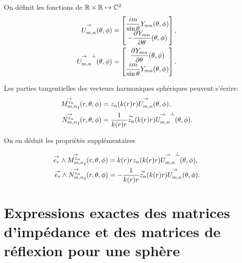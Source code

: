     \begin{defn}
        On définit les fonctions de \(\RR\times\RR\mapsto \CC^2\)
        \begin{align}
            \label{eq:defUmn_tgt}
            \Umn(\tp) &=
            \begin{bmatrix}
                \frac{im}{\sin\theta}Y_{mn}(\tp)
                \\
                - \ddr{\theta}{Y_{mn}}(\tp)
            \end{bmatrix},
            \\
            \label{eq:defNmn_tgt}
            \Umn^\perp(\tp) &=
            \begin{bmatrix}
                \ddr{\theta}{Y_{mn}}(\tp)
                \\
                \frac{im}{\sin\theta}Y_{mn}(\tp)
            \end{bmatrix}.
        \end{align}
    \end{defn}

    \begin{prop}
        Les parties tangentielles des vecteurs harmoniques sphériques peuvent s'écrire:
        \begin{align*}
          \Mmn[z_n]_t(\rtp) &= z_n(k(r)r)\Umn(\tp),
          \\
          \Nmn[z_n]_t(\rtp) &= \frac{1}{k(r)r}\tilde{z_n}(k(r)r)\Umn^\perp(\tp).
        \end{align*}
    \end{prop}

    On en déduit les propriétés supplémentaires
    \begin{prop}
        \label{prop:Mmn_Nmn_vect}
        \begin{align*}
          \vect{e_r} \pvect \Mmn[z_n]_t(\rtp) &= k(r)rz_n(k(r)r)\Umn^\perp(\tp),
          \\
          \vect{e_r} \pvect \Nmn[z_n]_t(\rtp) &= -\frac{1}{k(r)r}\tilde{z_n}(k(r)r)\Umn(\tp).
        \end{align*}
    \end{prop}

\section[Opérateur de Calderón pour une sphère]{Expressions exactes des matrices d'impédance et des matrices de réflexion pour une sphère}

    \begin{figure}[!hbt]
        \centering
        \begin{tikzpicture}
              
        \end{tikzpicture}
    \end{figure}

